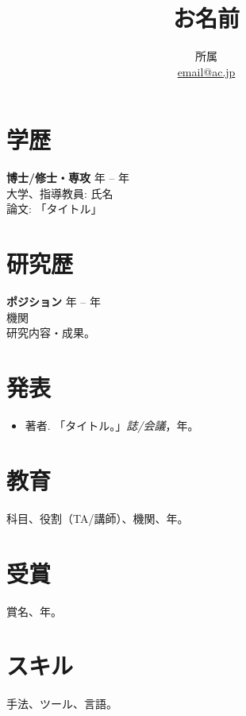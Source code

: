 \documentclass[11pt,a4paper]{article}
\title{\vspace{-1cm}\textbf{お名前}}
\author{所属 \\ \href{mailto:email@ac.jp}{email@ac.jp}}
\date{}
\begin{document}
\maketitle
\vspace{-0.6cm}

\section*{学歴}
\textbf{博士/修士・専攻} \hfill 年 -- 年 \\
大学、指導教員: 氏名 \\
論文: 「タイトル」

\section*{研究歴}
\textbf{ポジション} \hfill 年 -- 年 \\
機関 \\
研究内容・成果。

\section*{発表}
\begin{itemize}
  \item 著者. 「タイトル。」\textit{誌/会議}，年。
\end{itemize}

\section*{教育}
科目、役割（TA/講師）、機関、年。

\section*{受賞}
賞名、年。

\section*{スキル}
手法、ツール、言語。
\end{document}
